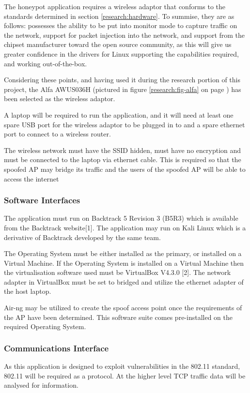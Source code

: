 The honeypot application requires a wireless adaptor that conforms to the standards determined in section \ref{research:hardware}. To summise, they are as follows: possesses the ability to be put into monitor mode to capture traffic on the network, support for packet injection into the network, and support from the chipset manufacturer toward the open source community, as this will give us greater confidence in the drivers for Linux supporting the capabilities required, and working out-of-the-box.

Considering these points, and having used it during the research portion of this project, the Alfa AWUS036H (pictured in figure \ref{research:fig-alfa} on page \pageref{research:fig-alfa}) has been selected as the wireless adaptor.

A laptop will be required to run the application, and it will need at least one spare USB port for the wireless adaptor to be plugged in to and a spare ethernet port to connect to a wireless router.

The wireless network must have the SSID hidden, must have no encryption and must be connected to the laptop via ethernet cable. This is required so that the spoofed AP may bridge its traffic and the users of the spoofed AP will be able to access the internet

\subsubsection{Software Interfaces}
The application must run on Backtrack 5 Revision 3 (B5R3) which is available from the Backtrack website[1]. The application may run on Kali Linux which is a derivative of Backtrack developed by the same team.

The Operating System must be either installed as the primary, or installed on a Virtual Machine. If the Operating System is installed on a Virtual Machine then the virtualisation software used must be VirtualBox V4.3.0 [2]. The network adapter in VirtualBox must be set to bridged and utilize the ethernet adapter of the host laptop.

Air-ng may be utilized to create the spoof access point once the requirements of the AP have been determined. This software suite comes pre-installed on the required Operating System. 

\subsubsection{Communications Interface}
As this application is designed to exploit vulnerabilities in the 802.11 standard, 802.11 will be required as a protocol. At the higher level TCP traffic data will be analysed for information.

